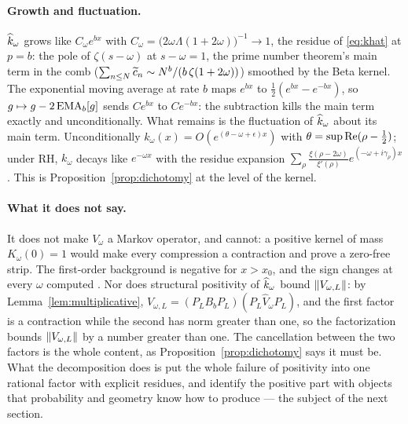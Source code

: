 \paragraph{Growth and fluctuation.} $\widehat k_\omega$ grows like $C_\omega e^{bx}$
with $C_\omega=\big(2\omega\Lambda(1+2\omega)\big)^{-1}\to1$, the residue of
\eqref{eq:khat} at $p=b$: the pole of $\zeta(s-\omega)$ at $s-\omega=1$, the
prime number theorem's main term in the comb
($\sum_{n\leq N}\widetilde c_n\sim N^b/(b\,\zeta(1+2\omega))$) smoothed by the Beta
kernel. The exponential moving average at rate $b$ maps $e^{bx}$ to
$\frac12(e^{bx}-e^{-bx})$, so $g\mapsto g-2\operatorname{EMA}_b[g]$ sends $Ce^{bx}$ to
$Ce^{-bx}$: the subtraction kills the main term exactly and unconditionally.
What remains is the fluctuation of $\widehat k_\omega$ about its main term.
Unconditionally $k_\omega(x)=O(e^{(\theta-\omega+\epsilon)x})$ with
$\theta=\sup\operatorname{Re}(\rho-\frac12)$; under RH, $k_\omega$ decays like $e^{-\omega x}$
with the residue expansion
$\sum_\rho\frac{\xi(\rho-2\omega)}{\xi'(\rho)}e^{(-\omega+i\gamma_\rho)x}$
\cite[Section~5.2]{WilsonReview}. This is Proposition~\ref{prop:dichotomy} at
the level of the kernel.

\paragraph{What it does not say.} It does not make $V_\omega$ a Markov
operator, and cannot: a positive kernel of mass $K_\omega(0)=1$ would make
every compression a contraction and prove a zero-free strip. The first-order
background is negative for $x>x_0$, and the sign changes at every $\omega$
computed \cite{LoewnerNote}. Nor does structural positivity of $\widehat k_\omega$
bound $\lVert V_{\omega,L}\rVert$: by Lemma~\ref{lem:multiplicative},
$V_{\omega,L}=(P_LB_bP_L)(P_L\widehat V_\omega P_L)$, and the first factor is a
contraction while the second has norm greater than one, so the factorization
bounds $\lVert V_{\omega,L}\rVert$ by a number greater than one. The cancellation
between the two factors is the whole content, as Proposition~\ref{prop:dichotomy}
says it must be. What the decomposition does is put the whole failure of
positivity into one rational factor with explicit residues, and identify the
positive part with objects that probability and geometry know how to produce
--- the subject of the next section.
